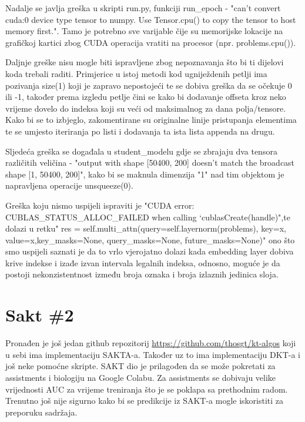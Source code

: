 		Nadalje se javlja greška u skripti run.py, funkciji run\_epoch - "can't convert cuda:0 device type tensor to numpy. Use Tensor.cpu() to copy the tensor to host memory first.". Tamo je potrebno sve varijable čije su memorijske lokacije na grafičkoj kartici zbog CUDA operacija vratiti na procesor (npr. problems.cpu()).
		
		Daljnje greške nisu mogle biti ispravljene zbog nepoznavanja što bi ti dijelovi koda trebali raditi. Primjerice u istoj metodi kod ugniježdenih petlji ima pozivanja size(1) koji je zapravo nepostojeći te se dobiva greška da se očekuje 0 ili -1, također prema izgledu petlje čini se kako bi dodavanje offseta kroz neko vrijeme dovelo do indeksa koji su veći od maksimalnog za dana polja/tensore. Kako bi se to izbjeglo, zakomentirane su originalne linije pristupanja elementima te se umjesto iteriranja po listi i dodavanja ta ista lista appenda na drugu.
		
		Sljedeća greška se događala u student\_modelu gdje se zbrajaju dva tensora različitih veličina - "output with shape [50400, 200] doesn't match the broadcast shape [1, 50400, 200]", kako bi se maknula dimenzija "1" nad tim objektom je napravljena operacije unsqueeze(0).
		
		Greška koju nismo uspijeli ispraviti je "CUDA error: CUBLAS\_STATUS\_ALLOC\_FAILED when calling `cublasCreate(handle)",te dolazi u
		retku" res = self.multi\_attn(query=self.layernorm(problems), key=x, value=x,key\_masks=None, query\_masks=None, future\_masks=None)" ono što smo uspijeli saznati je da to vrlo vjerojatno dolazi kada embedding layer dobiva krive indekse i izađe izvan intervala legalnih indeksa, odnosno, moguće je da postoji nekonzistentnost između broja oznaka i broja izlaznih jedinica sloja.
		
	\section{Sakt \#2}
		Pronađen je još jedan github repozitorij \url{https://github.com/thosgt/kt-algos} koji u sebi ima implementaciju SAKTA-a. Također uz to ima implementaciju DKT-a i još neke pomoćne skripte. SAKT dio je prilagođen da se može pokretati za assistments i biologiju na Google Colabu. Za assistments se dobivaju velike vrijednosti AUC za vrijeme treniranja što je se poklapa sa prethodnim radom. Trenutno još nije sigurno kako bi se predikcije iz SAKT-a mogle iskoristiti za preporuku sadržaja.
	
